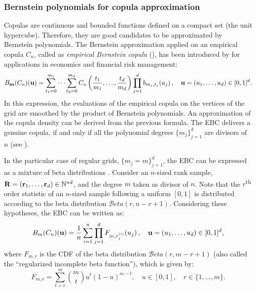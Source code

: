 \subsubsection{Bernstein polynomials for copula approximation}
Copulas are continuous and bounded functions defined on a compact set (the unit hypercube). 
Therefore, they are good candidates to be approximated by Bernstein polynomials. 
The Bernstein approximation applied on an empirical copula $C_n$, called as \emph{empirical Bernstein copula} (), has been introduced by \cite{sancetta_satchell_2004} for applications in economics and financial risk management: 
\begin{equation}
    B_{{\bf m}}(C_n)({\bf u}) = \sum_{t_1=0}^{m_1} \dots \sum_{t_d=0}^{m_d} C_n\left(\frac{t_1}{m_1}, \dots, \frac{t_d}{m_d}\right) \prod_{j=1}^d b_{m_j, t_j}(u_j) \, , \quad  {\bf u} = (u_1, \dots, u_d) \in [0, 1]^d.
    \label{eq:ebc}
\end{equation}
In this expression, the evaluations of the empirical copula on the vertices of the grid are smoothed by the product of Bernstein polynomials. 
An approximation of the copula density can be derived from the previous formula. 
The EBC delivers a genuine copula, if and only if all the polynomial degrees $\{m_j\}_{j=1}^d$ are divisors of $n$ (see \citealp[Proposition 2.5]{segers_2017}). 

In the particular case of regular grids, $\{m_j=m\}_{j=1}^d$, the EBC can be expressed as a mixture of beta distributions \citep{segers_2017}. 
Consider an $n$-sized rank sample, ${\bf R}=({\bf r}_1, \dots, {\bf r}_d) \in \mathbb{N}^{n d}$, and the degree $m$ taken as divisor of $n$. 
Note that the $r$\textsuperscript{th} order statistic of an $n$-sized sample following a uniform $[0, 1]$ is distributed according to the beta distribution $\mathcal{B}eta(r, n-r+1)$. 
Considering these hypotheses, the EBC can be written as: 
\begin{equation}
    B_{m}(C_n)({\bf u}) = \frac 1n \sum_{i=1}^n \prod_{j=1}^{d} F_{m, r_j^{(i)}}(u_j) \, , \quad  {\bf u} = (u_1, \dots, u_d) \in [0, 1]^d, 
\end{equation}
where $F_{m, r}$ is the CDF of the beta distribution $\mathcal{B}eta(r, m-r+1)$ (also called the ``regularized incomplete beta function''), which is given by: 
\begin{equation}
    F_{m, r} = \sum_{t=r}^{m} \binom{m}{t}u^t(1-u)^{m-t}, \quad u \in [0, 1], \quad r \in \{1, \dots, m\}. 
\end{equation}


